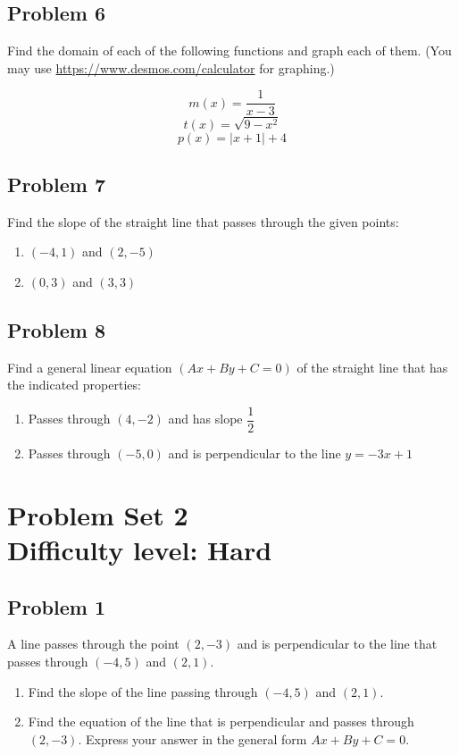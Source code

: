 \documentclass[12pt]{article}
\begin{document}
\subsection*{Problem 6}
Find the domain of each of the following functions and graph each of them. (You may use \url{https://www.desmos.com/calculator} for graphing.)

\[
m(x)=\dfrac{1}{x-3}
\]
\[
t(x)=\sqrt{9 - x^2}
\]
\[
p(x)=|x+1| + 4
\]

\subsection*{Problem 7}
Find the slope of the straight line that passes through the given points:
\begin{enumerate}[label=(\alph*)]
    \item \( (-4, 1) \) and \( (2, -5) \)
    \item \( (0, 3) \) and \( (3, 3) \)
\end{enumerate}

\subsection*{Problem 8}
Find a general linear equation \((Ax+By+C=0)\) of the straight line that has the indicated properties:
\begin{enumerate}[label=(\alph*)]
    \item Passes through \( (4, -2) \) and has slope \( \dfrac{1}{2} \)
    \item Passes through \( (-5, 0) \) and is perpendicular to the line \( y = -3x + 1 \)
\end{enumerate}

\section*{Problem Set 2\\Difficulty level: Hard}
\subsection*{Problem 1}
A line passes through the point \( (2, -3) \) and is perpendicular to the line that passes through \( (-4, 5) \) and \( (2, 1) \).\\

\begin{enumerate}[label=(\alph*)]
    \item Find the slope of the line passing through \( (-4, 5) \) and \( (2, 1) \).
    \item Find the equation of the line that is perpendicular and passes through \( (2, -3) \). Express your answer in the general form \( Ax + By + C = 0 \).
\end{enumerate}
\end{document}
